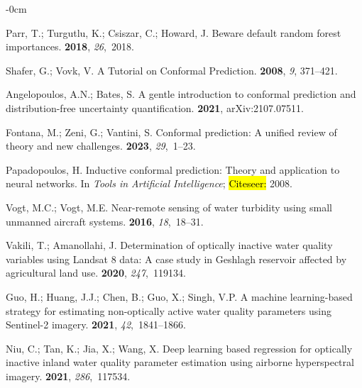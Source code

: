 \documentclass[remotesensing,article,accept,pdftex,moreauthors]{Definitions/mdpi}
\begin{document}
\begin{adjustwidth}{-\extralength}{0cm}
\begin{thebibliography}{999}
Parr, T.; Turgutlu, K.; Csiszar, C.; Howard, J.
\newblock Beware default random forest importances.
 {\bf 2018}, {\em 26},~2018.

Shafer, G.; Vovk, V.
\newblock A Tutorial on Conformal Prediction.
 {\bf 2008}, {\em 9}, 371--421.

Angelopoulos, A.N.; Bates, S.
\newblock A gentle introduction to conformal prediction and distribution-free
  uncertainty quantification.
 {\bf 2021},  arXiv:2107.07511.

Fontana, M.; Zeni, G.; Vantini, S.
\newblock Conformal prediction: A unified review of theory and new challenges.
 {\bf 2023}, {\em 29},~1--23.

Papadopoulos, H.
\newblock Inductive conformal prediction: Theory and application to neural
  networks. In {\em Tools in Artificial Intelligence}; \hl{Citeseer:} %
 2008.

Vogt, M.C.; Vogt, M.E.
\newblock Near-remote sensing of water turbidity using small unmanned aircraft
  systems.
 {\bf 2016}, {\em 18},~18--31.

Vakili, T.; Amanollahi, J.
\newblock Determination of optically inactive water quality variables using
  Landsat 8 data: A case study in Geshlagh reservoir affected by agricultural
  land use.
 {\bf 2020}, {\em 247},~119134.

Guo, H.; Huang, J.J.; Chen, B.; Guo, X.; Singh, V.P.
\newblock A machine learning-based strategy for estimating non-optically active
  water quality parameters using Sentinel-2 imagery.
 {\bf 2021}, {\em
  42},~1841--1866.

Niu, C.; Tan, K.; Jia, X.; Wang, X.
\newblock Deep learning based regression for optically inactive inland water
  quality parameter estimation using airborne hyperspectral imagery.
 {\bf 2021}, {\em 286},~117534.


\end{thebibliography}
\end{adjustwidth}
\end{document}
